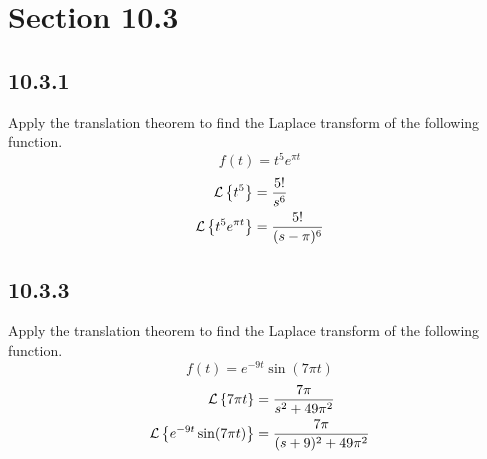 \documentclass{article}
\begin{document}
\newcommand{\hr}{\par\noindent\rule{\textwidth}{0.4pt}}

\newcommand{\bc}[1]{
	\begin{equation*}
		\begin{boxed}
			{#1}
		\end{boxed}
	\end{equation*}
}

\newcommand{\cond}[2]{
	\ifmmode
		{#1} \quad {#2}
	\else
		$$ {#1} \quad {#2} $$
	\fi
}

\newcommand{\matr}[1]{
	\ifmmode \bm{#1}
	\else \textit{\textbf{#1}}
	\fi
}
\newcommand{\vect}[1]{
	\ifmmode \mathbf{#1}
	\else \textbf{#1}
	\fi
}


\tableofcontents

\section{Section 10.3}

\subsection{10.3.1}

Apply the translation theorem to find the Laplace transform of the following function.
\begin{equation*}
	f(t) = t^5e^{\pi t}
\end{equation*}
\begin{align*}
	\lap[t^5] & = \frac{5!}{s^6} \\
	\lap[t^5e^{\pi t}] & = \frac{5!}{(s - \pi)^6}
\end{align*}

\subsection{10.3.3}

Apply the translation theorem to find the Laplace transform of the following function.
\begin{equation*}
	f(t) = e^{-9t}\sin(7\pi t)
\end{equation*}
\begin{align*}
	\lap[7\pi t] & = \frac{7\pi}{s^2 + 49\pi^2} \\
	\lap[e^{-9t}\sin(7\pi t)] & = \frac{7\pi}{(s + 9)^2 + 49\pi^2}
\end{align*}
\end{document}
